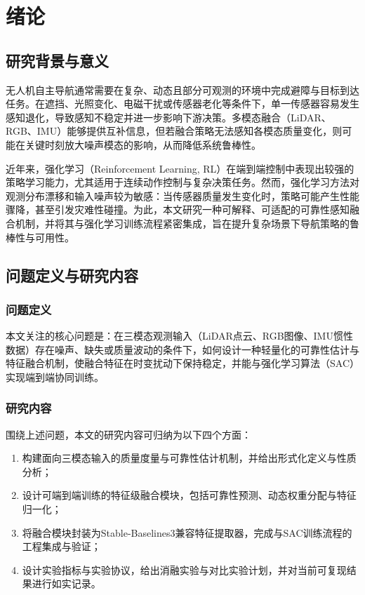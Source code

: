 \chapter{绪论}

\section{研究背景与意义}
无人机自主导航通常需要在复杂、动态且部分可观测的环境中完成避障与目标到达任务。在遮挡、光照变化、电磁干扰或传感器老化等条件下，单一传感器容易发生感知退化，导致感知不稳定并进一步影响下游决策。多模态融合（LiDAR、RGB、IMU）能够提供互补信息，但若融合策略无法感知各模态质量变化，则可能在关键时刻放大噪声模态的影响，从而降低系统鲁棒性。

近年来，强化学习（Reinforcement Learning, RL）在端到端控制中表现出较强的策略学习能力，尤其适用于连续动作控制与复杂决策任务。然而，强化学习方法对观测分布漂移和输入噪声较为敏感：当传感器质量发生变化时，策略可能产生性能骤降，甚至引发灾难性碰撞。为此，本文研究一种可解释、可适配的可靠性感知融合机制，并将其与强化学习训练流程紧密集成，旨在提升复杂场景下导航策略的鲁棒性与可用性。

\section{问题定义与研究内容}
\subsection{问题定义}
本文关注的核心问题是：在三模态观测输入（LiDAR点云、RGB图像、IMU惯性数据）存在噪声、缺失或质量波动的条件下，如何设计一种轻量化的可靠性估计与特征融合机制，使融合特征在时变扰动下保持稳定，并能与强化学习算法（SAC）实现端到端协同训练。

\subsection{研究内容}
围绕上述问题，本文的研究内容可归纳为以下四个方面：
\begin{enumerate}
    \item 构建面向三模态输入的质量度量与可靠性估计机制，并给出形式化定义与性质分析；
    \item 设计可端到端训练的特征级融合模块，包括可靠性预测、动态权重分配与特征归一化；
    \item 将融合模块封装为Stable-Baselines3兼容特征提取器，完成与SAC训练流程的工程集成与验证；
    \item 设计实验指标与实验协议，给出消融实验与对比实验计划，并对当前可复现结果进行如实记录。
\end{enumerate}

